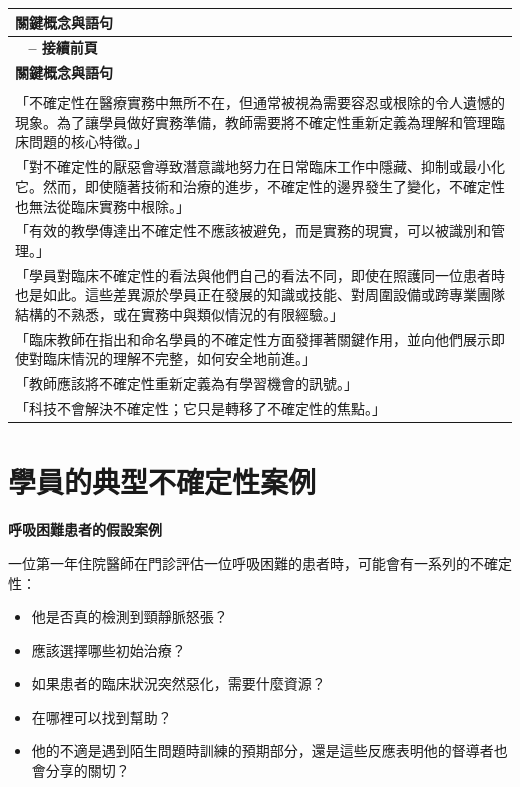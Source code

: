 \documentclass[12pt,a4paper]{article}
\begin{document}
\begin{longtable}{>{\raggedright\arraybackslash}p{15cm}}
\toprule
\textbf{\textcolor{emergency_blue}{關鍵概念與語句}} \\
\midrule
\endfirsthead

\multicolumn{1}{c}%
{{\bfseries \tablename\ \thetable{} -- 接續前頁}} \\
\toprule
\textbf{\textcolor{emergency_blue}{關鍵概念與語句}} \\
\midrule
\endhead

\midrule \multicolumn{1}{r}{{接續下頁}} \\ \midrule
\endfoot

\bottomrule
\endlastfoot

「不確定性在醫療實務中無所不在，但通常被視為需要容忍或根除的令人遺憾的現象。為了讓學員做好實務準備，教師需要將不確定性重新定義為理解和管理臨床問題的核心特徵。」 \\

「對不確定性的厭惡會導致潛意識地努力在日常臨床工作中隱藏、抑制或最小化它。然而，即使隨著技術和治療的進步，不確定性的邊界發生了變化，不確定性也無法從臨床實務中根除。」 \\

「有效的教學傳達出不確定性不應該被避免，而是實務的現實，可以被識別和管理。」 \\

「學員對臨床不確定性的看法與他們自己的看法不同，即使在照護同一位患者時也是如此。這些差異源於學員正在發展的知識或技能、對周圍設備或跨專業團隊結構的不熟悉，或在實務中與類似情況的有限經驗。」 \\

「臨床教師在指出和命名學員的不確定性方面發揮著關鍵作用，並向他們展示即使對臨床情況的理解不完整，如何安全地前進。」 \\

「教師應該將不確定性重新定義為有學習機會的訊號。」 \\

「科技不會解決不確定性；它只是轉移了不確定性的焦點。」 \\
\end{longtable}

\section{學員的典型不確定性案例}

\begin{importantbox}
\textbf{呼吸困難患者的假設案例}

一位第一年住院醫師在門診評估一位呼吸困難的患者時，可能會有一系列的不確定性：

\begin{itemize}
\item 他是否真的檢測到頸靜脈怒張？
\item 應該選擇哪些初始治療？
\item 如果患者的臨床狀況突然惡化，需要什麼資源？
\item 在哪裡可以找到幫助？
\item 他的不適是遇到陌生問題時訓練的預期部分，還是這些反應表明他的督導者也會分享的關切？
\end{itemize}
\end{importantbox}
\end{document}
